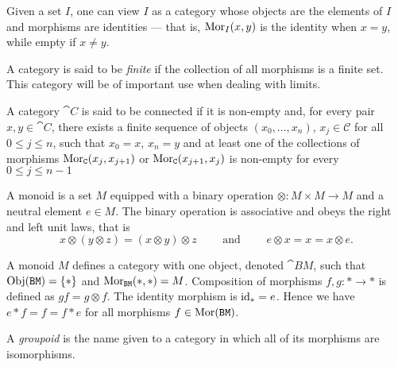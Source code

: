 \begin{example}
    \label{exp:index-category}
    Given a set \(I\), one can view \(I\) as a category whose objects are the
    elements of \(I\) and morphisms are identities --- that is, \(\operatorname{Mor}_I(x, y)\) is
    the identity when \(x = y\), while empty if \(x \neq y\).
\end{example}

\begin{definition}
    \label{def:finite-category}
    A category is said to be \emph{finite} if the collection of all morphisms is a
    finite set. This category will be of important use when dealing with limits.
\end{definition}

\begin{definition}
    \label{def:connected-category}
    A category \(\cat C\) is said to be connected if it is non-empty and, for every
    pair \(x, y \in \cat C\), there exists a finite sequence of objects \((x_0,
    \dots, x_n)\), \(x_j \in \mathcal C\) for all \(0 \leq j \leq n\), such that
    \(x_0 = x\), \(x_n = y\) and at least one of the collections of morphisms
    \(\operatorname{Mor}_{\texttt C}(x_j, x_{j+1})\) or \(\operatorname{Mor}_{\texttt C}(x_{j+1}, x_j)\) is non-empty
    for every \(0 \leq j \leq n - 1\)
\end{definition}


\begin{definition}[Monoid]\label{def: monoid}
    A monoid is a set \(M\) equipped with a binary operation \(\otimes: M \times M
    \to M\) and a neutral element \(e \in M\). The binary operation is associative
    and obeys the right and left unit laws, that is
    \[
        x \otimes (y \otimes z) = (x \otimes y) \otimes z \qquad \text{ and } \qquad
        e \otimes x = x = x \otimes e.
    \]
\end{definition}

\begin{example}
    A monoid \(M\) defines a category with one object, denoted \(\cat{BM}\), such
    that \(\operatorname{Obj}(\texttt{BM}) = \{*\}\) and \(\operatorname{Mor}_{\texttt{BM}}(*, *) =
    M\). Composition of morphisms \(f, g: * \to *\) is defined as \(g f = g
    \otimes f\). The identity morphism is \(\operatorname{id}_* = e\). Hence we have \(e * f = f =
    f * e\) for all morphisms \(f \in \operatorname{Mor}(\texttt{BM})\).
\end{example}

\begin{definition}[Groupoids]\label{def: groupoids}
    A \emph{groupoid} is the name given to a category in which all of its
    morphisms are isomorphisms.
\end{definition}

